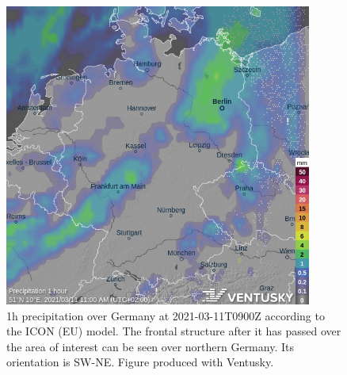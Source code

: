 \begin{figure}
    \centering
    \includegraphics[width=0.9\textwidth]{ventusky-rain-1h-20210311t0900-51n10e.jpg}
    \caption{1h precipitation over Germany at 2021-03-11T0900Z according to the ICON (EU) model. The frontal structure after it has passed over the area of interest can be seen over northern Germany. Its orientation is SW-NE. Figure produced with Ventusky.}
    \label{fig:ventusky2}
\end{figure}

